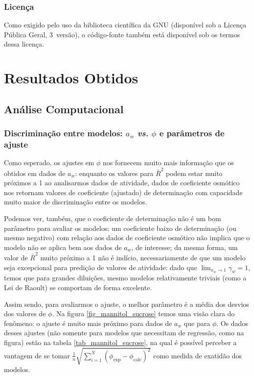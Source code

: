 \documentclass[
	12pt,				%
	openright,
	twoside,
	a4paper,			%
	english,			%
	french,				%
	spanish,			%
	brazil				%
	]{abntex2}
\begin{document}
\section{Licença}

Como exigido pelo uso da biblioteca científica da GNU (disponível sob a Licença
Pública Geral, 3\textordfeminine\ versão), o código-fonte também está disponível
sob os termos dessa licença.

\part{Resultados Obtidos}

\chapter{Análise Computacional}

\section{Discriminação entre modelos: $a_w$ \textit{vs.} $\phi$ e %
parâmetros de ajuste}

Como esperado, os ajustes em $\phi$ nos fornecem muito mais informação que os
obtidos em dados de $a_w$: enquanto os valores para $\bar{R}^2$ podem estar
muito próximos a 1 ao analisarmos dados de atividade, dados de coeficiente
osmótico nos retornam valores de coeficiente (ajustado) de determinação com
capacidade muito maior de discriminação entre os modelos.

Podemos ver, também, que o coeficiente de determinação não é um bom parâmetro para
avaliar os modelos: um coeficiente baixo de determinação (ou mesmo negativo) com
relação aos dados de coeficiente osmótico não implica que o modelo não se aplica
bem aos dados de $a_w$, de interesse; da mesma forma, um valor de $\bar{R}^2$ muito
próximo a 1 não é indício, necessariamente de que um modelo seja excepcional para
predição de valores de atividade: dado que $\lim_{x_w \to 1}\gamma_w = 1$, temos
que para grandes diluições, mesmo modelos relativamente triviais (como a Lei de
Raoult) se comportam de forma excelente.

Assim sendo, para avaliarmos o ajuste, o melhor parâmetro é a média dos desvios
dos valores de $\phi$. Na figura \ref{fig_mannitol_sucrose} temos uma visão clara
do fenômeno: o ajuste é muito mais próximo para dados de $a_w$ que para $\phi$.
Os dados desses ajustes (não somente para modelos que necessitam de regressão,
como na figura) estão na tabela \ref{tab_mannitol_sucrose}, na qual é possível
perceber a vantagem de se tomar
$\frac{1}{n}\sqrt{\sum_{i=1}^N(\phi_{\text{exp}}-\phi_{\text{calc}})^2}$
como medida de exatidão dos modelos.
\end{document}
